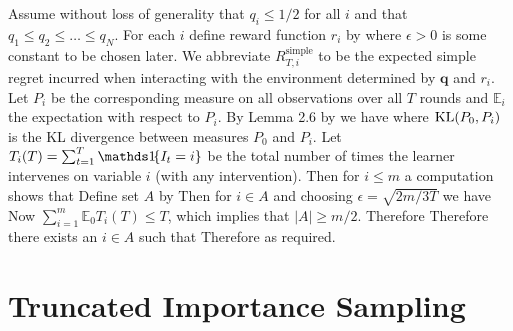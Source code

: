 Assume without loss of generality that $q_i \leq 1/2$ for all $i$ and that $q_1 \leq q_2 \leq \ldots \leq q_N$.
For each $i$ define reward function $r_i$ by
where $\epsilon > 0$ is some constant to be chosen later.
We abbreviate $R_{T,i}^{\text{simple}}$ to be the expected simple regret incurred when interacting with the
environment determined by $\boldsymbol{q}$ and $r_i$. Let $P_i$ be the corresponding measure
on all observations over all $T$ rounds and $\mathbb E_i$ the expectation with respect to $P_i$. By Lemma 2.6 by \cite{Tsy08} we have
where $\operatorname{KL}(P_0, P_i)$ is the KL divergence between measures $P_0$ and $P_i$.
Let $T_i(T) = \sum_{t=1}^T \ind{I_t = i}$ be the total number of times the learner intervenes on variable $i$ (with any intervention). 
Then for $i \leq m$ a computation shows that 
Define set $A$ by
Then for $i \in A$ and choosing $\epsilon = \sqrt{2m/3T}$ we have
Now $\sum_{i=1}^m \mathbb E_0 T_i(T) \leq T$, which implies that $|A| \geq m/2$.
Therefore
Therefore there exists an $i \in A$ such that
Therefore
as required.


\section*{Truncated Importance Sampling}

